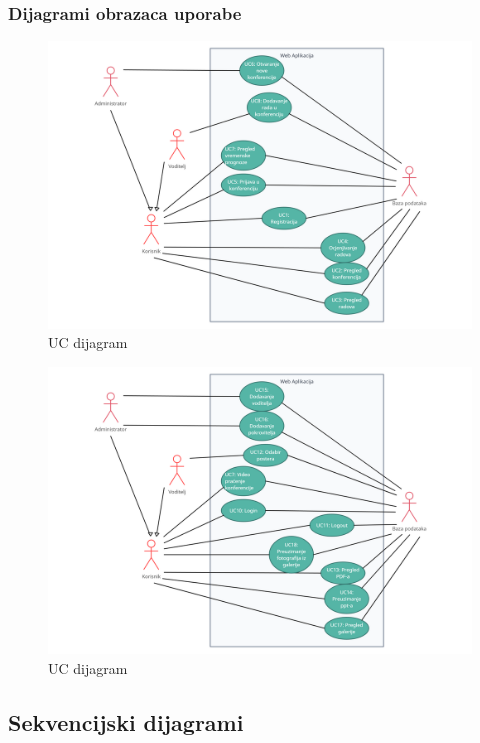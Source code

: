 				
					
				\subsubsection{Dijagrami obrazaca uporabe}
					
		\begin{figure}[H]
			\includegraphics[scale=0.2]{slike/UML1.JPG} 
			\centering
			\caption{UC dijagram}
			\label{UML1}
		\end{figure}
		
		\begin{figure}[H]
			\includegraphics[scale=0.2]{slike/UML2.JPG} 
			\centering
			\caption{UC dijagram}
			\label{UML1}
		\end{figure}			
		\newpage
		\subsection{Sekvencijski dijagrami}
		
